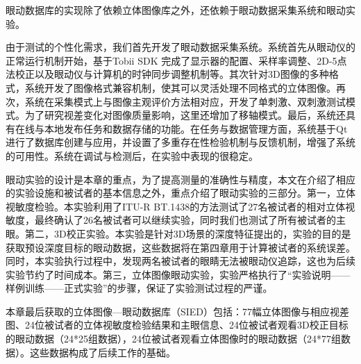 眼动数据库的实现除了依赖立体图像库之外，还依赖于眼动数据采集系统和眼动实验。

由于测试的个性化需求，我们首先开发了眼动数据采集系统。系统首先从眼动仪的正常运行机制开始，基于Tobii SDK 完成了显示器的配置、采样率调整、2D-5点法校正以及眼动仪与计算机的时钟同步调整机制等。其次针对3D图像的多种格式，系统开发了图像格式兼容机制，使其可以灵活处理不同格式的立体图像。再次，系统在采集模式上与图像主观评价方法相对应，开发了单刺激、双刺激测试模式。为了研究视差变化对图像质量影响，这里还增加了移轴模式。最后，系统还具有在线与本地发布任务和数据存储的功能。在任务与数据管理方面，系统基于Qt进行了数据库创建与应用，并设置了多重存在性检验机制与反馈机制，增强了系统的可用性。系统在调试与检测后，在实验中表现的很稳定。

眼动实验的设计是本章的重点，为了提高测量的准确性与精度，本文在介绍了相应的实验设施和被试者的基本信息之外，重点介绍了眼动实验的三部分。第一，立体视敏度检验。本实验利用了ITU-R BT.1438的方法测试了27名被试者的相对立体视敏度，最终确认了26名被试者可以继续实验，同时我们也测试了所有被试者的主眼。第二，3D校正实验。本实验是针对3D场景的深度特征提出的，实验的目的是获取预设深度目标的眼动数据，这些数据将在第四章用于计算被试者的系统误差。同时，本实验执行过程中，发现两名被试者的眼睛无法被眼动仪追踪，这也为后续实验节约了时间成本。第三，立体图像眼动实验，实验严格执行了“实验说明——样例训练——正式实验”的步骤，保证了实验测试过程的严谨。

本章最后获取的立体图像—眼动数据库（SIED）包括：77幅立体图像与相应视差图、24位被试者的立体视敏度检验结果和主眼信息、24位被试者观看3D校正目标的眼动数据（24*25组数据），24位被试者观看立体图像时的眼动数据（24*77组数据）。这些数据构成了后续工作的基础。

